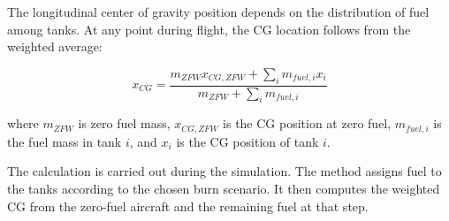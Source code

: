 The longitudinal center of gravity position depends on the distribution of fuel among tanks. At any point during flight, the CG location follows from the weighted average:

\begin{equation}
x_{CG} = \frac{m_{ZFW} x_{CG,ZFW} + \sum_{i} m_{fuel,i} x_i}{m_{ZFW} + \sum_{i} m_{fuel,i}}
\end{equation}

where $m_{ZFW}$ is zero fuel mass, $x_{CG,ZFW}$ is the CG position at zero fuel, $m_{fuel,i}$ is the fuel mass in tank $i$, and $x_i$ is the CG position of tank $i$.

The calculation is carried out during the simulation. The method assigns fuel to the tanks according to the chosen burn scenario. It then computes the weighted CG from the zero-fuel aircraft and the remaining fuel at that step.

